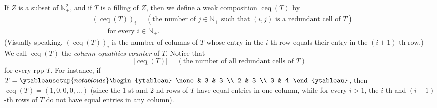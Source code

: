 \documentclass[numbers=enddot,12pt,final,onecolumn,notitlepage]{scrartcl}%
\theoremstyle{definition}
\begin{document}
If $Z$ is a subset of $\mathbb{N}_{+}^{2}$, and if $T$ is a filling of $Z$,
then we define a weak composition $\operatorname*{ceq}\left(  T\right)  $ by%
\begin{align}
&  \left(  \operatorname*{ceq}\left(  T\right)  \right)  _{i}=\left(
\text{the number of }j\in\mathbb{N}_{+}\text{ such that }\left(  i,j\right)
\text{ is a redundant cell of }T\right) \label{eq.gtilde.ceq.def}\\
&  \ \ \ \ \ \ \ \ \ \ \text{for every }i\in\mathbb{N}_{+}.\nonumber
\end{align}
(Visually speaking, $\left(  \operatorname*{ceq}\left(  T\right)  \right)
_{i}$ is the number of columns of $T$ whose entry in the $i$-th row equals
their entry in the $\left(  i+1\right)  $-th row.) We call
$\operatorname*{ceq}\left(  T\right)  $ the \textit{column-equalities counter}
of $T$. Notice that%
\begin{equation}
\left\vert \operatorname*{ceq}\left(  T\right)  \right\vert =\left(  \text{the
number of all redundant cells of }T\right)  \label{eq.gtilde.ceq.abs}%
\end{equation}
for every rpp $T$. For instance, if $T=%
\ytableausetup{notabloids}
\begin{ytableau}
\none& 3 & 3 \\
2 & 3 \\
3 & 4
\end{ytableau}%
$, then $\operatorname*{ceq}\left(  T\right)  =\left(  1,0,0,0,\ldots\right)
$ (since the $1$-st and $2$-nd rows of $T$ have equal entries in one column,
while for every $i>1$, the $i$-th and $\left(  i+1\right)  $-th rows of $T$ do
not have equal entries in any column).
\end{document}
